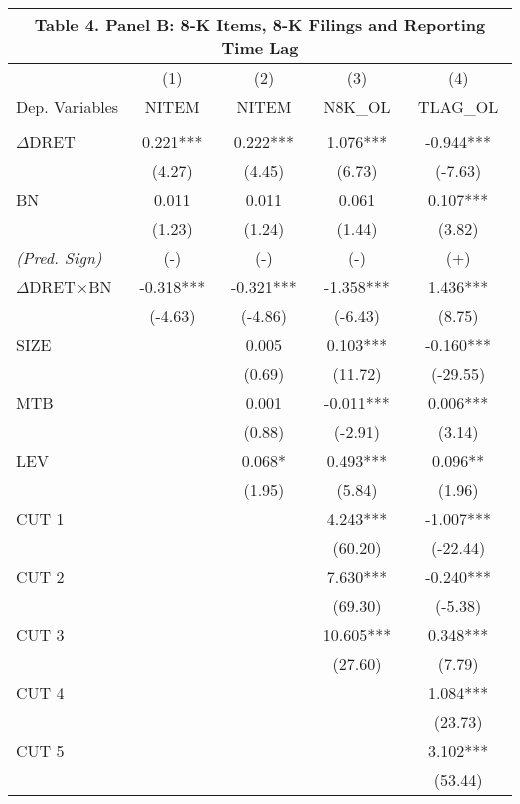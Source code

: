 \begin{table}[H] \label{T4PB}%
	\begin{center}
		\begin{tabular}{lcccc}
			\multicolumn{5}{c}{\textbf{Table 4. Panel B: 8-K Items, 8-K Filings and Reporting Time Lag}} \\
			\midrule
			\midrule
			& (1) & (2) & (3) & (4) \\
			Dep. Variables & NITEM & NITEM & N8K\_OL & TLAG\_OL \\
			\midrule
			&   &   &   &  \\
			$\Delta$DRET & 0.221*** & 0.222*** & 1.076*** & -0.944*** \\
			& (4.27) & (4.45) & (6.73) & (-7.63) \\
			BN & 0.011 & 0.011 & 0.061 & 0.107*** \\
			& (1.23) & (1.24) & (1.44) & (3.82) \\
			\rowcolor[rgb]{ .933,  .925,  .882} \textit{(Pred. Sign)} & (-) & (-) & (-) & (+) \\
			\rowcolor[rgb]{ .933,  .925,  .882} $\Delta$DRET$\times$BN & -0.318*** & -0.321*** & -1.358*** & 1.436*** \\
			\rowcolor[rgb]{ .933,  .925,  .882}   & (-4.63) & (-4.86) & (-6.43) & (8.75) \\
			SIZE &   & 0.005 & 0.103*** & -0.160*** \\
			&   & (0.69) & (11.72) & (-29.55) \\
			MTB &   & 0.001 & -0.011*** & 0.006*** \\
			&   & (0.88) & (-2.91) & (3.14) \\
			LEV &   & 0.068* & 0.493*** & 0.096** \\
			&   & (1.95) & (5.84) & (1.96) \\
			CUT 1 &   &   & 4.243*** & -1.007*** \\
			&   &   & (60.20) & (-22.44) \\
			CUT 2 &   &   & 7.630*** & -0.240*** \\
			&   &   & (69.30) & (-5.38) \\
			CUT 3 &   &   & 10.605*** & 0.348*** \\
			&   &   & (27.60) & (7.79) \\
			CUT 4 &   &   &   & 1.084*** \\
			&   &   &   & (23.73) \\
			CUT 5 &   &   &   & 3.102*** \\
			&   &   &   & (53.44) \\

\end{tabular}
\end{center}
\end{table}
